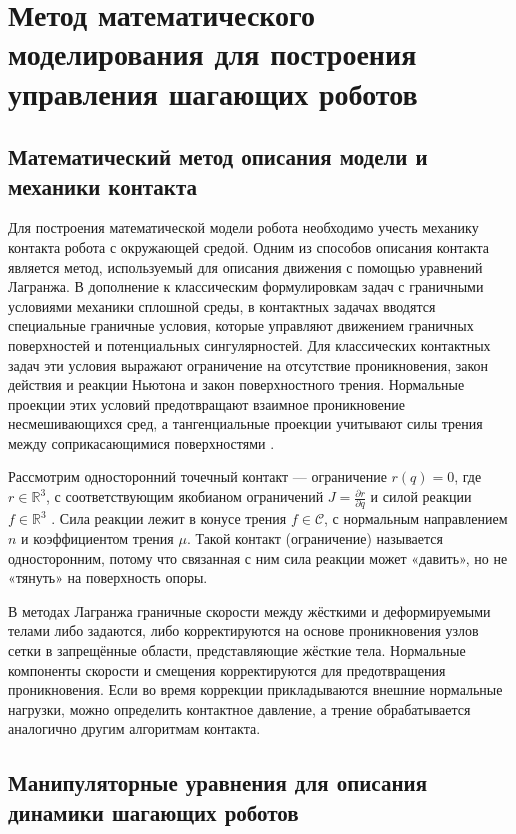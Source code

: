 \chapter{Метод математического моделирования для построения управления шагающих роботов}\label{ch:ch2}

\section{Математический метод описания модели и механики контакта}\label{sec:ch2/sect2}
Для построения математической модели робота необходимо учесть механику контакта робота с окружающей средой.
Одним из способов описания контакта является метод, используемый для описания движения с помощью уравнений Лагранжа. В дополнение к классическим формулировкам задач с граничными условиями механики сплошной среды, в контактных задачах вводятся специальные граничные условия, которые управляют движением граничных поверхностей и потенциальных сингулярностей. Для классических контактных задач эти условия выражают ограничение на отсутствие проникновения, закон действия и реакции Ньютона и закон поверхностного трения. Нормальные проекции этих условий предотвращают взаимное проникновение несмешивающихся сред, а тангенциальные проекции учитывают силы трения между соприкасающимися поверхностями \cite{Shamim2024}.

Рассмотрим односторонний точечный контакт --- ограничение ${r}({q}) = 0$, где ${r} \in \mathbb{R}^3$, с соответствующим якобианом ограничений ${J} = \frac{\partial {r}}{\partial {q}}$ и силой реакции ${f} \in \mathbb{R}^3$ \cite{Posa2014}.
%
Сила реакции лежит в конусе трения ${f} \in \mathcal{C}$, с нормальным направлением ${n}$ и коэффициентом трения $\mu$.
%
Такой контакт (ограничение) называется односторонним, потому что связанная с ним сила реакции может «давить», но не «тянуть» на поверхность опоры.

В методах Лагранжа граничные скорости между жёсткими и деформируемыми телами либо задаются, либо корректируются на основе проникновения узлов сетки в запрещённые области, представляющие жёсткие тела. Нормальные компоненты скорости и смещения корректируются для предотвращения проникновения. Если во время коррекции прикладываются внешние нормальные нагрузки, можно определить контактное давление, а трение обрабатывается аналогично другим алгоритмам контакта.

\section{Манипуляторные уравнения для описания динамики шагающих роботов}\label{sec:ch2/sect3}

